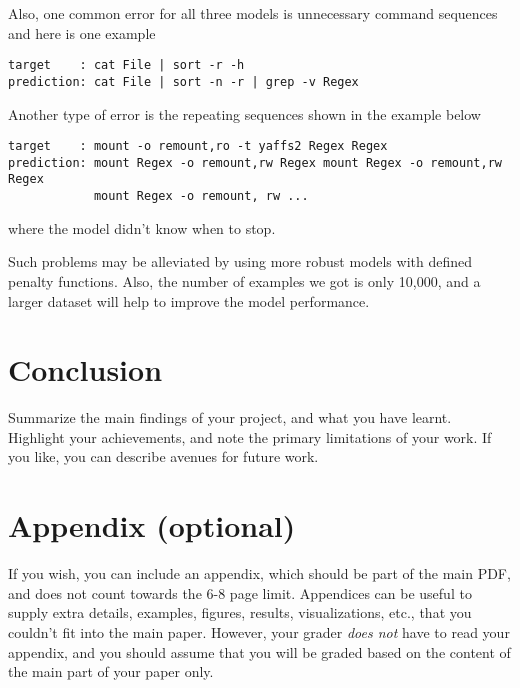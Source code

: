 \documentclass{article}
\begin{document}
Also, one common error for all three models is unnecessary command sequences and here is one example
\begin{verbatim}
target    : cat File | sort -r -h 
prediction: cat File | sort -n -r | grep -v Regex
\end{verbatim}
Another type of error is the repeating sequences shown in the example below
\begin{verbatim}
target    : mount -o remount,ro -t yaffs2 Regex Regex 
prediction: mount Regex -o remount,rw Regex mount Regex -o remount,rw Regex 
            mount Regex -o remount, rw ...
\end{verbatim}
where the model didn't know when to stop.

Such problems may be alleviated by using more robust models with defined penalty functions. Also, the number of examples we got is only 10,000, and a larger dataset will help to improve the model performance.

\section{Conclusion}
Summarize the main findings of your project, and what you have learnt. Highlight your achievements, and note the primary limitations of your work. If you like, you can describe avenues for future work.






\appendix

\section{Appendix (optional)}
If you wish, you can include an appendix, which should be part of the main PDF, and does not count towards the 6-8 page limit.
Appendices can be useful to supply extra details, examples, figures, results, visualizations, etc., that you couldn't fit into the main paper. However, your grader \textit{does not} have to read your appendix, and you should assume that you will be graded based on the content of the main part of your paper only.
\end{document}
